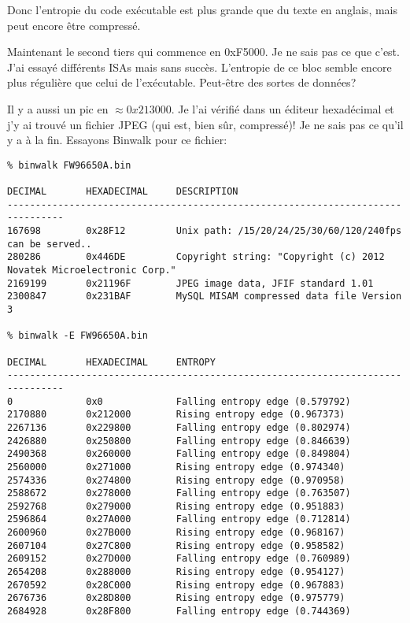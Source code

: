 Donc l'entropie du code exécutable est plus grande que du texte en anglais, mais
peut encore être compressé.

Maintenant le second tiers qui commence en 0xF5000. Je ne sais pas ce que c'est.
J'ai essayé différents \ac{ISA}s mais sans succès.
L'entropie de ce bloc semble encore plus régulière que celui de l'exécutable.
Peut-être des sortes de données?

Il y a aussi un pic en $\approx 0x213000$.
Je l'ai vérifié dans un éditeur hexadécimal et j'y ai trouvé un fichier JPEG (qui
est, bien sûr, compressé)!
Je ne sais pas ce qu'il y a à la fin.
Essayons Binwalk pour ce fichier:

\begin{lstlisting}
% binwalk FW96650A.bin 

DECIMAL       HEXADECIMAL     DESCRIPTION
--------------------------------------------------------------------------------
167698        0x28F12         Unix path: /15/20/24/25/30/60/120/240fps can be served..
280286        0x446DE         Copyright string: "Copyright (c) 2012 Novatek Microelectronic Corp."
2169199       0x21196F        JPEG image data, JFIF standard 1.01
2300847       0x231BAF        MySQL MISAM compressed data file Version 3

% binwalk -E FW96650A.bin 

DECIMAL       HEXADECIMAL     ENTROPY
--------------------------------------------------------------------------------
0             0x0             Falling entropy edge (0.579792)
2170880       0x212000        Rising entropy edge (0.967373)
2267136       0x229800        Falling entropy edge (0.802974)
2426880       0x250800        Falling entropy edge (0.846639)
2490368       0x260000        Falling entropy edge (0.849804)
2560000       0x271000        Rising entropy edge (0.974340)
2574336       0x274800        Rising entropy edge (0.970958)
2588672       0x278000        Falling entropy edge (0.763507)
2592768       0x279000        Rising entropy edge (0.951883)
2596864       0x27A000        Falling entropy edge (0.712814)
2600960       0x27B000        Rising entropy edge (0.968167)
2607104       0x27C800        Rising entropy edge (0.958582)
2609152       0x27D000        Falling entropy edge (0.760989)
2654208       0x288000        Rising entropy edge (0.954127)
2670592       0x28C000        Rising entropy edge (0.967883)
2676736       0x28D800        Rising entropy edge (0.975779)
2684928       0x28F800        Falling entropy edge (0.744369)
\end{lstlisting}

